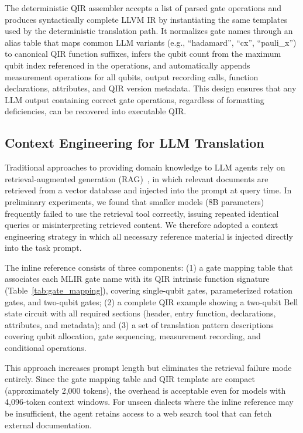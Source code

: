 \documentclass[conference]{IEEEtran}
\begin{document}
The deterministic QIR assembler accepts a list of parsed gate operations and produces syntactically complete LLVM IR by instantiating the same templates used by the deterministic translation path. It normalizes gate names through an alias table that maps common LLM variants (e.g., ``hadamard'', ``cx'', ``pauli\_x'') to canonical QIR function suffixes, infers the qubit count from the maximum qubit index referenced in the operations, and automatically appends measurement operations for all qubits, output recording calls, function declarations, attributes, and QIR version metadata. This design ensures that any LLM output containing correct gate operations, regardless of formatting deficiencies, can be recovered into executable QIR.

\subsection{Context Engineering for LLM Translation}\label{sec:context}

Traditional approaches to providing domain knowledge to LLM agents rely on retrieval-augmented generation (RAG)~\cite{lewis2020rag}, in which relevant documents are retrieved from a vector database and injected into the prompt at query time. In preliminary experiments, we found that smaller models (8B parameters) frequently failed to use the retrieval tool correctly, issuing repeated identical queries or misinterpreting retrieved content. We therefore adopted a context engineering strategy in which all necessary reference material is injected directly into the task prompt.

The inline reference consists of three components: (1) a gate mapping table that associates each MLIR gate name with its QIR intrinsic function signature (Table~\ref{tab:gate_mapping}), covering single-qubit gates, parameterized rotation gates, and two-qubit gates; (2) a complete QIR example showing a two-qubit Bell state circuit with all required sections (header, entry function, declarations, attributes, and metadata); and (3) a set of translation pattern descriptions covering qubit allocation, gate sequencing, measurement recording, and conditional operations.

This approach increases prompt length but eliminates the retrieval failure mode entirely. Since the gate mapping table and QIR template are compact (approximately 2,000 tokens), the overhead is acceptable even for models with 4,096-token context windows. For unseen dialects where the inline reference may be insufficient, the agent retains access to a web search tool that can fetch external documentation.
\end{document}
